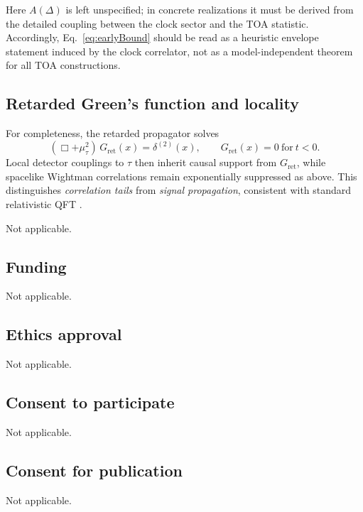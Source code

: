 \documentclass[pdflatex,sn-mathphys-num]{sn-jnl}
\theoremstyle{thmstylethree}
\theoremstyle{thmstyleone}
\theoremstyle{thmstyletwo}
\numberwithin{equation}{section}
\newcommand{\Gret}{G_{\mathrm{ret}}}
\begin{document}
        Here $A(\Delta)$ is left unspecified; in concrete realizations it must be derived from the detailed coupling between the clock sector and the TOA statistic. Accordingly, Eq.~\eqref{eq:earlyBound} should be read as a heuristic envelope statement induced by the clock correlator, not as a model-independent theorem for all TOA constructions.
    
    \subsection{Retarded Green's function and locality}
        
        For completeness, the retarded propagator solves
        \begin{equation}
            (\Box+\mu_\tau^2)\,\Gret(x)=\delta^{(2)}(x),
            \qquad \Gret(x)=0\ \text{for}\ t<0.
        \end{equation}
        Local detector couplings to $\tau$ then inherit causal support from $\Gret$, while spacelike Wightman correlations remain exponentially suppressed as above. This distinguishes \emph{correlation tails} from \emph{signal propagation}, consistent with standard relativistic QFT \cite{Peskin1995,Weinberg1995}.

        
        \backmatter
        
        Not applicable.
        
    
    \subsection*{Funding}
        Not applicable.
        
    \subsection*{Ethics approval}
        Not applicable.
    
    \subsection*{Consent to participate}
        Not applicable.
    
    \subsection*{Consent for publication}
        Not applicable.
    
\end{document}
